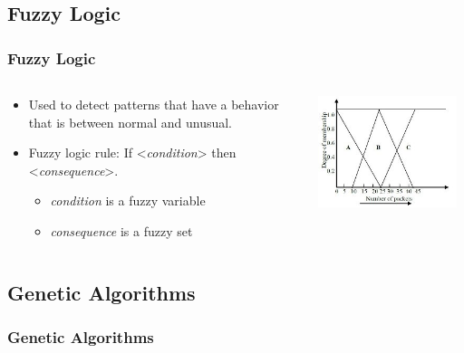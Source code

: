 \documentclass{beamer}
\begin{document}
\subsection{Fuzzy Logic}
\begin{frame}
  \frametitle{Fuzzy Logic}
  \begin{columns}
  \begin{column}{0.6\textwidth}
  \begin{itemize}
  	\item Used to detect patterns that have a behavior that is between normal and unusual.
  	\item Fuzzy logic rule: If <\emph{condition}> then <\emph{consequence}>.
  	\begin{itemize}
  		\item \emph{condition} is a fuzzy variable
  		\item \emph{consequence} is a fuzzy set
  	\end{itemize}
  \end{itemize}  
  \end{column}

  \begin{column}{0.4\textwidth}
  \includegraphics[width=0.95\textwidth]{../triangleFigure.JPG}
  \end{column}
  \end{columns}
\end{frame}


\subsection{Genetic Algorithms}
\begin{frame}
  \frametitle{Genetic Algorithms}

\end{frame}
\end{document}
